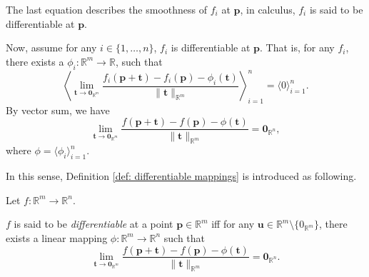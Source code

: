 \begin{observation}
	The last equation describes the smoothness of $f_i$ at $\mathbf p$, in calculus, $f_i$ is said to be differentiable at $\mathbf p$.
	
	Now, assume for any $i \in \{1, \ldots, n\}$, $f_i$ is differentiable at $\mathbf p$. That is, for any $f_i$, there exists a $\phi_i:\mathbb R^m \to \mathbb R$, such that
	$$
	\left\langle\lim_{\mathbf t \to \mathbf 0_{\mathbb R^m}} \frac{f_i(\mathbf p + \mathbf t) - f_i(\mathbf p) - \phi_i(\mathbf t)}{\|\mathbf t\|_{\mathbb R^m}} \right\rangle_{i = 1}^n = \langle 0 \rangle_{i = 1}^n.
	$$
	By vector sum, we have
	$$
	\lim_{\mathbf t \to \mathbf 0_{\mathbb R^m}} \frac{f(\mathbf p + \mathbf t) - f(\mathbf p) - \phi(\mathbf t)}{\|\mathbf t\|_{\mathbb R^m}} = \mathbf 0_{\mathbb R^n},
	$$
	where $\phi = \langle \phi_i \rangle_{i = 1}^n$.
	
	In this sense, Definition \ref{def: differentiable mappings} is introduced as following.
\end{observation}


\begin{definition}
	\label{def: differentiable mappings}
	Let $f:\mathbb R^m \to \mathbb R^n$.
	
	$f$ is said to be \textit{differentiable} at a point $\mathbf p \in \mathbb R^m$ iff for any $\mathbf u \in \mathbb R^m \setminus \{0_{\mathbb R^m}\}$, there exists a linear mapping $\phi: \mathbb R^m \to \mathbb R^n$ such that
	$$
	\lim_{\mathbf t \to \mathbf 0_{\mathbb R^m}}\frac{f(\mathbf p + \mathbf t) - f(\mathbf p) - \phi(\mathbf t)}{\| \mathbf t \|_{\mathbb R^m}} = \mathbf 0_{\mathbb R^n}.
	$$
\end{definition}


